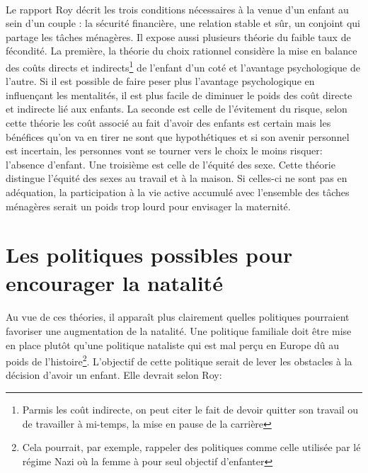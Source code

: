\paragraph{}Le rapport Roy\citep{quebec} décrit les trois conditions nécessaires à la venue d’un enfant au sein d’un couple : la sécurité financière, une relation stable et sûr, un conjoint qui partage les tâches ménagères\citep[pp.19]{quebec}. Il expose aussi plusieurs théorie du faible taux de fécondité. La première, la théorie du choix rationnel considère la mise en balance des coûts directs et indirects\footnote{Parmis les coût indirecte, on peut citer le fait de devoir quitter son travail ou de travailler à mi-temps, la mise en pause de la carrière} de l’enfant d’un coté et l’avantage psychologique de l’autre. Si il est possible de faire peser plus l’avantage psychologique en influençant les mentalités, il est plus facile de diminuer le poids des coût directe et indirecte lié aux enfants\citep[pp.23]{quebec}. La seconde est celle de l’évitement du risque, selon cette théorie les coût associé au fait d’avoir des enfants est certain mais les bénéfices qu’on va en tirer ne sont que hypothétiques et si son avenir personnel est incertain, les personnes vont se tourner vers le choix le moins risquer: l’absence d’enfant\citep[pp.24]{quebec}. Une troisième est celle de l’équité des sexe\citep[pp.25]{quebec}. Cette théorie distingue l’équité des sexes au travail et à la maison. Si celles-ci ne sont pas en adéquation, la participation à la vie active accumulé avec l'ensemble des tâches ménagères serait un poids trop lourd pour envisager la maternité. 
\section{Les politiques possibles pour encourager la natalité}
\paragraph{}Au vue de ces théories, il apparaît plus clairement quelles politiques pourraient favoriser une augmentation de la natalité. Une politique familiale doit être mise en place plutôt qu’une politique nataliste qui est mal perçu en Europe dû au poids de l’histoire\citep[pp.27]{quebec}\footnote{Cela pourrait, par exemple, rappeler des politiques comme celle utilisée par lé régime Nazi où la femme à pour seul objectif d'enfanter\citep{nazi}}. L’objectif de cette politique serait de lever les obstacles à la décision d’avoir un enfant. Elle devrait selon Roy\citep[pp.43-46]{quebec}:


